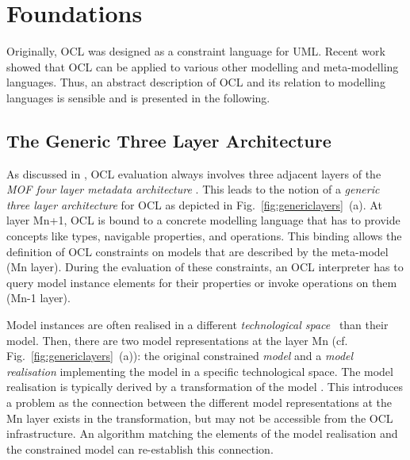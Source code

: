 \section{Foundations}
\label{sec:foundation}

Originally, OCL was designed as a constraint language for UML. Recent work showed
that OCL can be applied to various other modelling and meta-modelling languages. Thus,
an abstract description of OCL and its relation to modelling languages is sensible
and is presented in the following.

\subsection{The Generic Three Layer Architecture}
As discussed in \cite{demuthRGWS09}, OCL evaluation
always involves three adjacent layers of the \emph{MOF four layer metadata
architecture} \cite{spec:MOF1-4}. This leads to the notion of 
a \emph{generic three layer architecture} for OCL as depicted in
Fig.~\ref{fig:genericlayers}~(a). 
At layer Mn+1, OCL is bound to a concrete modelling language that has to provide 
concepts like
types, navigable properties, and operations. 
This binding allows the definition of
OCL constraints on models that are described by the meta-model (Mn layer).
During the evaluation of these constraints, an OCL interpreter has to query model
instance elements for their properties or invoke operations on them (Mn-1 layer).

Model instances are often realised in
a different \emph{technological space}~\cite{kurtev2002technological} than their model. Then, there are two model
representations at the layer Mn (cf.
Fig.~\ref{fig:genericlayers}~(a)): the original constrained \emph{model} and a
\emph{model realisation} implementing the model in a specific technological space. The
model realisation is typically derived by a transformation of the model
\cite{WWW:EMF}. 
This introduces a problem as the connection between the different model representations
at the Mn layer exists in the transformation, but may not be accessible from the OCL infrastructure.
An algorithm matching the elements of the model realisation and the constrained model can re-establish
this connection.

